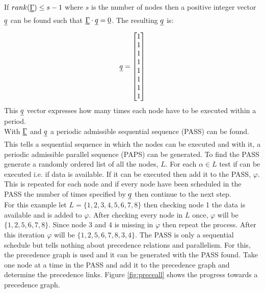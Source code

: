 If $rank(\uuline \Gamma) \leq s-1$ where $s$ is the number of nodes then a positive integer vector $\uline q$ can be found such that $\uuline\Gamma \cdot \uline q = \uline 0$. The resulting $\uline q$ is:
\begin{equation}
  \uline{q} =
  \begin{bmatrix}
  1 \\
  1 \\
  1 \\
  1 \\
  1 \\
  1 \\
  1 \\
  1
  \end{bmatrix}
\end{equation}
This $\uline q$ vector expresses how many times each node have to be executed within a period.\\

With $\uuline \Gamma$ and $\uline q$ a periodic admissible sequential sequence (PASS) can be found. This tells a sequential sequence in which the nodes can be executed and with it, a periodic admissible parallel sequence (PAPS) can be generated. To find the PASS generate a randomly ordered list of all the nodes, $L$. For each $\alpha \in L$ test if can be executed i.e. if data is available. If it can be executed then add it to the PASS, $\varphi$. This is repeated for each node and if every node have been scheduled in the PASS the number of times specified by $\uline q$ then continue to the next step.\\
For this example let $L=\{1, 2, 3, 4, 5, 6, 7, 8 \}$ then checking node 1 the data is available and is added to $\varphi$. After checking every node in $L$ once, $\varphi$ will be $\{1, 2, 5, 6, 7, 8 \}$. Since node 3 and 4 is missing in $\varphi$ then repeat the process. After this iteration $\varphi$ will be $\{1, 2, 5, 6, 7, 8, 3, 4 \}$. The PASS is only a sequential schedule but tells nothing about precedence relations and parallelism. For this, the precedence graph is used and it can be generated with the PASS found. Take one node at a time in the PASS and add it to the precedence graph and determine the precedence links. Figure \vref{fig:preceall} shows the progress towards a precedence graph.\\

